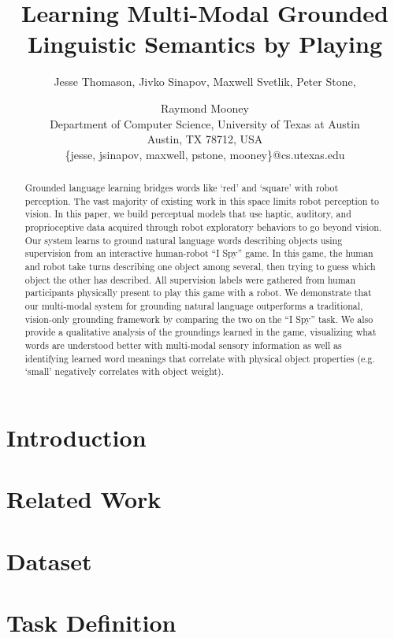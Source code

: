 \documentclass{article}
\title{Learning Multi-Modal Grounded Linguistic Semantics by Playing \ispy}
\author{Jesse Thomason, Jivko Sinapov, Maxwell Svetlik, Peter Stone,\and Raymond Mooney \\
Department of Computer Science, University of Texas at Austin\\
Austin, TX 78712, USA\\
\{jesse, jsinapov, maxwell, pstone, mooney\}@cs.utexas.edu}
\newcommand{\ispy}{``I Spy''\xspace}
\begin{document}
\maketitle

\begin{abstract}
Grounded language learning bridges words like `red' and `square' with robot perception.
The vast majority of existing work in this space limits robot perception to vision.
In this paper, we build perceptual models that use haptic, auditory, and proprioceptive data acquired through robot exploratory behaviors to go beyond vision.
Our system learns to ground natural language words describing objects using supervision from an interactive human-robot \ispy game.
In this game, the human and robot take turns describing one object among several, then trying to guess which object the other has described.
All supervision labels were gathered from human participants physically present to play this game with a robot.
We demonstrate that our multi-modal system for grounding natural language outperforms a traditional, vision-only grounding framework by comparing the two on the \ispy task.
We also provide a qualitative analysis of the groundings learned in the game, visualizing what words are understood better with multi-modal sensory information as well as identifying learned word meanings that correlate with physical object properties (e.g. `small' negatively correlates with object weight).
\end{abstract}

\section{Introduction}
\label{sec:introduction}
	

\section{Related Work}
\label{sec:relatedwork}
	

\section{Dataset}
\label{sec:dataset}
	

\section{Task Definition}
\label{sec:taskdefinition}
	
\end{document}
